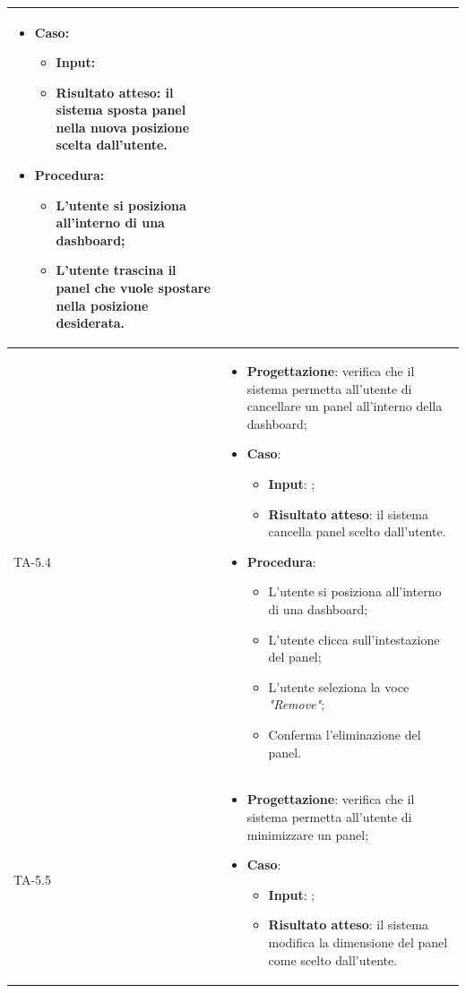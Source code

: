 \begin{longtable}{|C{2.5cm}|C{13cm}|}
\begin{itemize}
	\item \textbf{Caso}: 
	\begin{itemize}
		\item \textbf{Input}:
		\item \textbf{Risultato atteso}: il sistema sposta panel nella nuova posizione scelta dall'utente.
	\end{itemize}
	\item \textbf{Procedura}:
	\begin{itemize}
		\item L'utente si posiziona all'interno di una dashboard;
		\item L'utente trascina il panel che vuole spostare nella posizione desiderata.
	\end{itemize} 
\end{itemize} \\
\hline
{TA-5.4} &
\begin{itemize}
	\item \textbf{Progettazione}: verifica che il sistema permetta all'utente di cancellare un panel all'interno della dashboard;
	\item \textbf{Caso}: 
	\begin{itemize}
		\item \textbf{Input}: ;
		\item \textbf{Risultato atteso}: il sistema cancella panel scelto dall'utente.
	\end{itemize}
	\item \textbf{Procedura}:
	\begin{itemize}
		\item L'utente si posiziona all'interno di una dashboard;
		\item L'utente clicca sull'intestazione del panel;
		\item L'utente seleziona la voce \emph{"Remove"};
		\item Conferma l'eliminazione del panel.
	\end{itemize} 
\end{itemize} \\
\hline
{TA-5.5} &
\begin{itemize}
	\item \textbf{Progettazione}: verifica che il sistema permetta all'utente di minimizzare un panel;
	\item \textbf{Caso}: 
	\begin{itemize}
		\item \textbf{Input}: ;
		\item \textbf{Risultato atteso}: il sistema modifica la dimensione del panel come scelto dall'utente.

\end{itemize}
\end{itemize}
\end{longtable}

